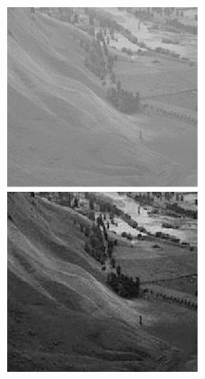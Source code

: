 \documentclass{article}
\begin{document}
\begin{enumerate}[label=B\arabic*)]
		\inputminted[tabsize=4, linenos]{Python}{equalization.py}
		\begin{figure}[h!]
			\begin{minipage}{0.32\textwidth}
				\centering
				\includegraphics[width=0.9\linewidth]{Hist/Hist1.jpg}
			\end{minipage}
			\hfill
			\begin{minipage}{0.32\textwidth}
				\centering
				\includegraphics[width=0.9\linewidth]{Hist/Hist1_gray.png}

\end{minipage}
\end{figure}
\end{enumerate}
\end{document}
